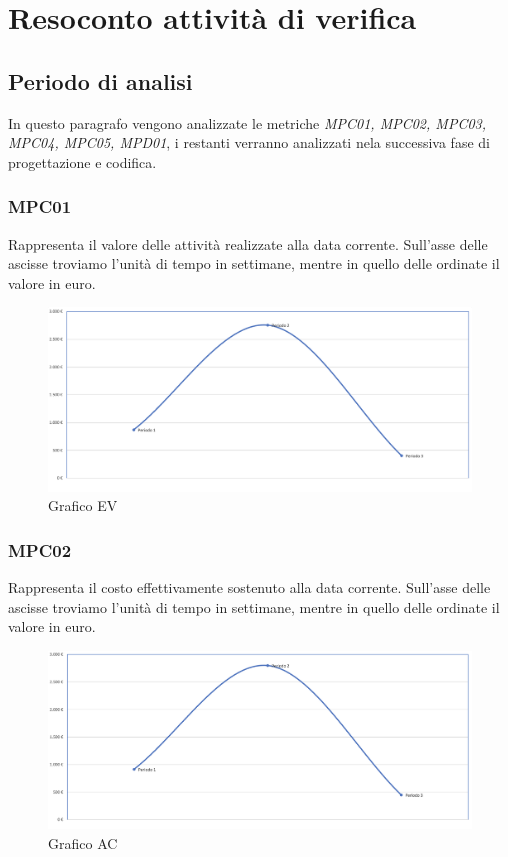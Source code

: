 \section{Resoconto attività di verifica}
\subsection{Periodo di analisi}
In questo paragrafo vengono analizzate le metriche \textit{MPC01, MPC02, MPC03, MPC04, MPC05, MPD01}, i restanti verranno analizzati nela successiva fase di progettazione e codifica.
\subsubsection{MPC01}
Rappresenta il valore delle attività realizzate alla data corrente.
Sull'asse delle ascisse troviamo l'unità di tempo in settimane, mentre in quello delle ordinate il valore in euro.
\begin{figure}[H]
\centering
\includegraphics[width=1\textwidth]{src/img/grafico_EV.png}
\caption{Grafico EV}
\end{figure}

\subsubsection{MPC02}
Rappresenta il costo effettivamente sostenuto alla data corrente.
Sull'asse delle ascisse troviamo l'unità di tempo in settimane, mentre in quello delle ordinate il valore in euro.
\begin{figure}[H]
\centering
\includegraphics[width=1\textwidth]{src/img/grafico_AC.png}
\caption{Grafico AC}
\end{figure}

